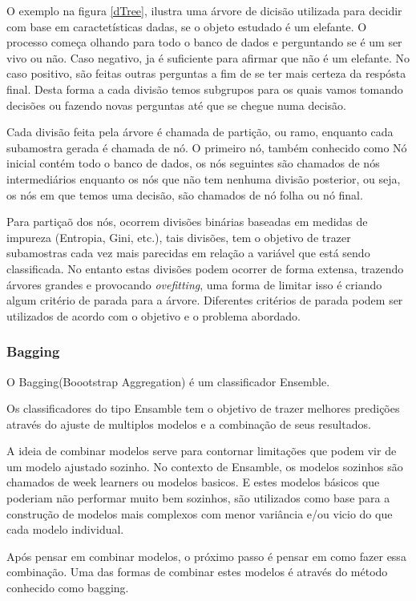 \documentclass[12pt,a4paper]{article}
\begin{document}
O exemplo na figura \ref{dTree}, ilustra uma árvore de dicisão utilizada para decidir com base em caractetísticas dadas, se o objeto estudado é um elefante. O processo começa olhando para todo o banco de dados e perguntando se é um ser vivo ou não. Caso negativo, ja é suficiente para afirmar que não é um elefante. No caso positivo, são feitas outras perguntas a fim de se ter mais certeza da respósta final. Desta forma a cada divisão temos subgrupos para os quais vamos tomando decisões ou fazendo novas perguntas até que se chegue numa decisão.


Cada divisão feita pela árvore é chamada de partição, ou ramo, enquanto cada subamostra gerada é chamada de nó. O primeiro nó, também conhecido como Nó inicial contém todo o banco de dados, os nós seguintes são chamados de nós intermediários enquanto os nós que não tem nenhuma divisão posterior, ou seja, os nós em que temos uma decisão, são chamados de nó folha ou nó final. 

Para partiçaõ dos nós, ocorrem divisões binárias baseadas  em medidas de impureza (Entropia, Gini, etc.), tais divisões, tem o objetivo de trazer subamostras cada vez mais parecidas em relação a variável que está sendo classificada. No entanto estas divisões podem ocorrer de forma extensa, trazendo árvores grandes e provocando \emph{ovefitting}, uma forma de limitar isso é criando algum critério de parada para a árvore. Diferentes critérios de parada podem ser utilizados de acordo com o objetivo e o problema abordado.



\subsubsection{Bagging}

O Bagging(Boootstrap Aggregation) é um classificador Ensemble.

Os classificadores do tipo Ensamble tem o objetivo de trazer melhores predições através do ajuste de multiplos modelos e a combinação de seus resultados. 

A ideia de combinar modelos serve para contornar limitações que podem vir de um modelo ajustado sozinho. No contexto de Ensamble, os modelos sozinhos são chamados de week learners ou modelos basicos. E estes modelos básicos que poderiam não performar muito bem sozinhos, são utilizados como base para a construção de modelos mais complexos com menor variância e/ou vicio do que cada modelo individual.

Após pensar em combinar modelos, o próximo passo é pensar em como fazer essa combinação. Uma das formas de combinar estes modelos é através do método conhecido como bagging. 
\end{document}
